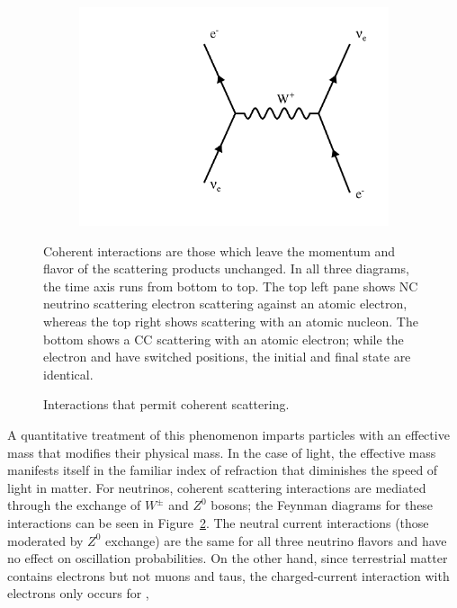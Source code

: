 \begin{figure}
\begin{center}
        \begin{subfigure}[b]{0.45\textwidth}
                \centering
                \includegraphics[width=\textwidth]{figures/feynman/ccElec.pdf}
                \caption{}
                 \label{ccElec}
        \end{subfigure}
\end{center}
\caption{Interactions that permit coherent scattering.}{
Coherent interactions are those which leave the momentum
and flavor of the scattering products unchanged.
In all three diagrams, the time axis runs from bottom to top.
The top left pane shows NC neutrino scattering electron scattering against an
atomic electron, whereas the top right shows scattering with an atomic
nucleon.
The bottom shows a CC scattering with an atomic electron;
while the electron and \nue have switched positions, the initial and
final state are identical.
}
\label{cohScatter}
\end{figure}
A quantitative treatment of this phenomenon imparts particles with an effective
mass that modifies their physical mass.
In the case of light, the effective mass manifests itself in the familiar index
of refraction that diminishes the speed of light in matter.
For neutrinos, coherent scattering interactions are mediated through the
exchange of $W^\pm$ and $Z^0$ bosons; the Feynman diagrams for these
interactions can be seen in Figure~\ref{cohScatter}.
The neutral current interactions (those moderated by $Z^0$ exchange) are the
same for all three neutrino flavors and have no effect on oscillation
probabilities.
On the other hand, since terrestrial matter contains electrons but not muons
and taus, the charged-current interaction with electrons only occurs for \nue,

